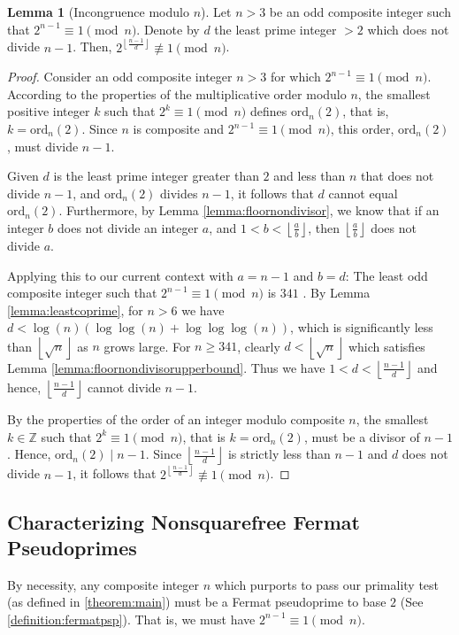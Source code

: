 \documentclass{article}
\theoremstyle{plain}
\theoremstyle{definition}
\newtheorem{lemma}{Lemma}
\newcommand{\ordn}[1]{\text{ord}_n\left({#1}\right)}
\begin{document}
\begin{lemma}[Incongruence modulo $n$] \label{lemma:incongruencemodn}
Let \( n > 3 \) be an odd composite integer such that \( 2^{n-1} \equiv 1 \pmod{n} \). Denote by \( d \) the least prime integer \( > 2 \) which does not divide \( n-1 \). Then, \( 2^{\left\lfloor\frac{n-1}{d}\right\rfloor} \not\equiv 1 \pmod{n} \).
\end{lemma}
\begin{proof}
Consider an odd composite integer \( n > 3 \) for which \( 2^{n-1} \equiv 1 \pmod{n} \). According to the properties of the multiplicative order modulo $n$, the smallest positive integer \( k \) such that \( 2^k \equiv 1 \pmod{n} \) defines \( \ordn{2} \), that is, \( k = \ordn{2} \). Since $n$ is composite and \( 2^{n-1} \equiv 1 \pmod{n} \), this order, \( \ordn{2} \), must divide \( n-1 \).

Given \( d \) is the least prime integer greater than $2$ and less than \( n \) that does not divide \( n-1 \), and \( \ordn{2} \) divides \( n-1 \), it follows that $d$ cannot equal \( \ordn{2} \). Furthermore, by Lemma \ref{lemma:floornondivisor}, we know that if an integer \( b \) does not divide an integer \( a \), and \( 1 < b < \left\lfloor \frac{a}{b} \right\rfloor \), then \( \left\lfloor \frac{a}{b} \right\rfloor \) does not divide \( a \).

Applying this to our current context with \( a = n-1 \) and \( b = d \): The least odd composite integer such that \( 2^{n-1} \equiv 1 \pmod{n} \) is $341$ \cite{oeisfermatpspbase2}. By Lemma \ref{lemma:leastcoprime}, for $n > 6$ we have $d < \log (n) (\log \log (n) + \log \log \log (n))$, which is significantly less than $\left\lfloor\sqrt{n}\right\rfloor$ as $n$ grows large. For $n \geq 341$, clearly $d < \left\lfloor\sqrt{n}\right\rfloor$ which satisfies Lemma \ref{lemma:floornondivisorupperbound}. Thus we have \( 1 < d < \left\lfloor \frac{n-1}{d} \right\rfloor \) and hence, \( \left\lfloor \frac{n-1}{d} \right\rfloor \) cannot divide \( n-1 \).

By the properties of the order of an integer modulo composite $n$, the smallest $k \in \mathbb{Z}$ such that $2^k \equiv 1 \pmod{n}$, that is $k = \ordn{2}$, must be a divisor of $n-1$. Hence, $\ordn{2} \mid n-1$. Since $\left\lfloor\frac{n-1}{d}\right\rfloor$ is strictly less than $n-1$ and $d$ does not divide $n-1$, it follows that $2^{\left\lfloor\frac{n-1}{d}\right\rfloor} \not\equiv 1 \pmod{n}$.
\end{proof}

\subsection{Characterizing Nonsquarefree Fermat Pseudoprimes}
By necessity, any composite integer $n$ which purports to pass our primality test (as defined in \cref{theorem:main}) must be a Fermat pseudoprime to base $2$ (See \cref{definition:fermatpsp}). That is, we must have $2^{n-1} \equiv 1 \pmod{n}$.
\end{document}
